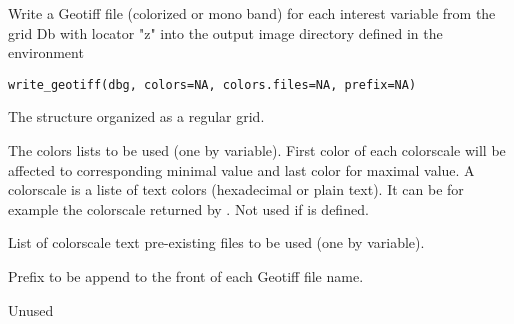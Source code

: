 %
\begin{Description}\relax
Write a Geotiff file (colorized or mono band) for each interest variable from the grid Db with locator "z" into the output image directory defined in the environment
\end{Description}
%
\begin{Usage}
\begin{verbatim}
write_geotiff(dbg, colors=NA, colors.files=NA, prefix=NA)
\end{verbatim}
\end{Usage}
%
\begin{Arguments}
\begin{ldescription}
\item[\code{dbg}] 
The  structure organized as a regular grid.

\item[\code{colors}] 
The colors lists to be used (one by variable). First color of each colorscale will be affected to corresponding minimal value and last color for maximal value. A colorscale is a liste of text colors (hexadecimal or plain text). It can be for example the colorscale returned by . Not used if  is defined.

\item[\code{colors.files}] 
List of colorscale text pre-existing files to be used (one by variable).

\item[\code{Prefix}] 
Prefix to be append to the front of each Geotiff file name.

\end{ldescription}
\end{Arguments}
%
\begin{Value}
Unused
\end{Value}
